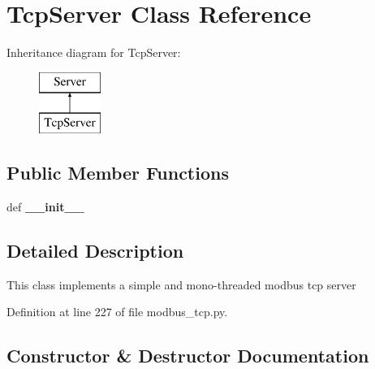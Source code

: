 \section{Tcp\+Server Class Reference}
\label{classmodbus__tk_1_1modbus__tcp_1_1_tcp_server}
Inheritance diagram for Tcp\+Server\+:\begin{figure}[H]
\begin{center}
\leavevmode
\includegraphics[height=2.000000cm]{classmodbus__tk_1_1modbus__tcp_1_1_tcp_server}
\end{center}
\end{figure}
\subsection*{Public Member Functions}
\begin{DoxyCompactItemize}
\item 
def {\bf \+\_\+\+\_\+init\+\_\+\+\_\+}
\end{DoxyCompactItemize}


\subsection{Detailed Description}
\begin{DoxyVerb}This class implements a simple and mono-threaded modbus tcp server\end{DoxyVerb}
 

Definition at line 227 of file modbus\+\_\+tcp.\+py.



\subsection{Constructor \& Destructor Documentation}
